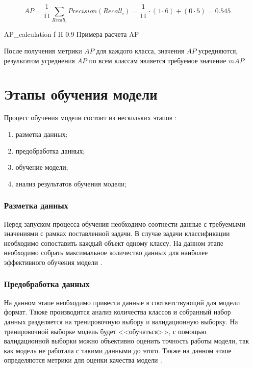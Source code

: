 \begin{equation}
	\label{eq:AP}
	AP = \frac{1}{11}\sum_{Recall_i}Precision(Recall_i) = \frac{1}{11} \cdot (1 \cdot 6) + (0 \cdot 5) = 0.545
\end{equation}


{AP_calculation} %
{f} %
{H} %
{0.9\textwidth} %
{Примера расчета AP} %

После получения метрики $AP$ для каждого класса, значения $AP$ усредняются, результатом усреднения  $AP$ по всем классам является требуемое значение $mAP$.


\section{Этапы обучения модели}
Процесс обучения модели состоит из нескольких этапов \cite{learning}:
\begin{enumerate}
	\item разметка данных;
	\item предобработка данных;
	\item обучение модели;
	\item анализ результатов обучения модели;
\end{enumerate}

\subsubsection{Разметка данных}
Перед запуском процесса обучения необходимо соотнести данные с требуемыми значениями с рамках поставленной задачи. В случае задачи классификации
необходимо сопоставить каждый объект одному классу. На данном этапе необходимо собрать  максимальное количество данных для наиболее эффективного обучения модели \cite{learning}.

\subsubsection{Предобработка данных}
На данном этапе необходимо привести данные в соответствующий для модели формат. Также производится анализ количества классов и собранный набор данных
разделяется на тренировочную выбору и валидационную выборку. На тренировочной выборке модель будет <<обучаться>>, с помощью валидационной выборки 
можно объективно оценить точность работы модели, так как модель не работала с такими данными до этого. Также на данном этапе определяются метрики для оценки качества модели \cite{learning}.


